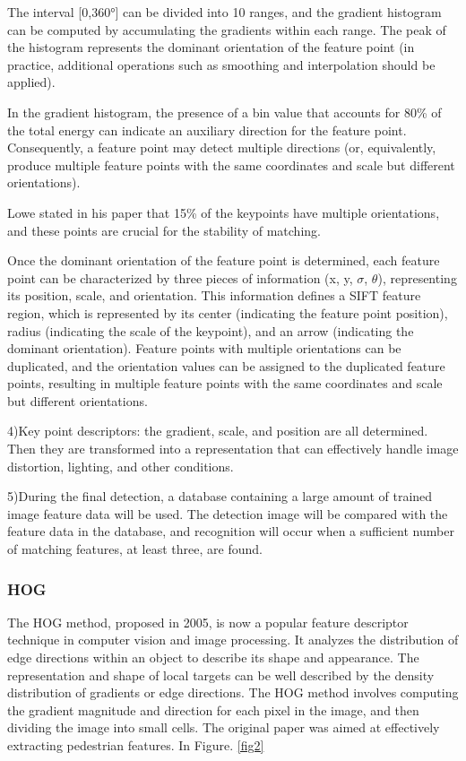 \documentclass[10pt,twocolumn,letterpaper]{article}
\begin{document}
The interval [0,360°] can be divided into 10 ranges, and the gradient histogram can be computed by accumulating the gradients within each range. The peak of the histogram represents the dominant orientation of the feature point (in practice, additional operations such as smoothing and interpolation should be applied).

In the gradient histogram, the presence of a bin value that accounts for 80\% of the total energy can indicate an auxiliary direction for the feature point. Consequently, a feature point may detect multiple directions (or, equivalently, produce multiple feature points with the same coordinates and scale but different orientations).
  
Lowe stated in his paper that 15\% of the keypoints have multiple orientations, and these points are crucial for the stability of matching.
  
Once the dominant orientation of the feature point is determined, each feature point can be characterized by three pieces of information (x, y, $\sigma$, $\theta$), representing its position, scale, and orientation. This information defines a SIFT feature region, which is represented by its center (indicating the feature point position), radius (indicating the scale of the keypoint), and an arrow (indicating the dominant orientation). Feature points with multiple orientations can be duplicated, and the orientation values can be assigned to the duplicated feature points, resulting in multiple feature points with the same coordinates and scale but different orientations.

4)Key point descriptors: the gradient, scale, and position are all determined. Then they are transformed into a representation that can effectively handle image distortion, lighting, and other conditions.

5)During the final detection, a database containing a large amount of trained image feature data will be used. The detection image will be compared with the feature data in the database, and recognition will occur when a sufficient number of matching features, at least three, are found.\cite{siftblog}


\subsubsection{HOG}

The HOG method\cite{Alpher03}, proposed in 2005, is now a popular feature descriptor technique in computer vision and image processing. It analyzes the distribution of edge directions within an object to describe its shape and appearance. The representation and shape of local targets can be well described by the density distribution of gradients or edge directions. The HOG method involves computing the gradient magnitude and direction for each pixel in the image, and then dividing the image into small cells. The original paper was aimed at effectively extracting pedestrian features. In Figure. \ref{fig2}
\end{document}
